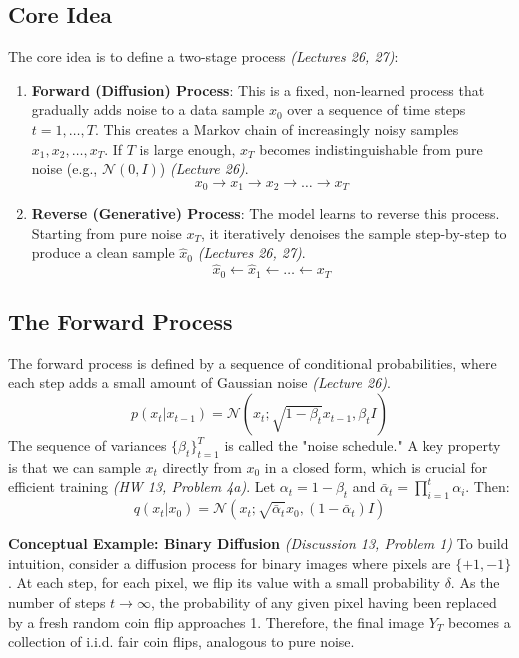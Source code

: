 \documentclass[11pt]{article}
\begin{document}
\subsection{Core Idea}
The core idea is to define a two-stage process \textit{(Lectures 26, 27)}:
\begin{enumerate}
    \item \textbf{Forward (Diffusion) Process}: This is a fixed, non-learned process that gradually adds noise to a data sample $x_0$ over a sequence of time steps $t=1, \dots, T$. This creates a Markov chain of increasingly noisy samples $x_1, x_2, \dots, x_T$. If $T$ is large enough, $x_T$ becomes indistinguishable from pure noise (e.g., $\mathcal{N}(0, I)$) \textit{(Lecture 26)}.
    \[ x_0 \rightarrow x_1 \rightarrow x_2 \rightarrow \dots \rightarrow x_T \]
    \item \textbf{Reverse (Generative) Process}: The model learns to reverse this process. Starting from pure noise $x_T$, it iteratively denoises the sample step-by-step to produce a clean sample $\hat{x}_0$ \textit{(Lectures 26, 27)}.
    \[ \hat{x}_0 \leftarrow \hat{x}_1 \leftarrow \dots \leftarrow x_T \]
\end{enumerate}

\subsection{The Forward Process}
The forward process is defined by a sequence of conditional probabilities, where each step adds a small amount of Gaussian noise \textit{(Lecture 26)}.
\[ p(x_t|x_{t-1}) = \mathcal{N}(x_t; \sqrt{1-\beta_t}x_{t-1}, \beta_t I) \]
The sequence of variances $\{\beta_t\}_{t=1}^T$ is called the "noise schedule." A key property is that we can sample $x_t$ directly from $x_0$ in a closed form, which is crucial for efficient training \textit{(HW 13, Problem 4a)}. Let $\alpha_t = 1 - \beta_t$ and $\bar{\alpha}_t = \prod_{i=1}^t \alpha_i$. Then:
\[ q(x_t|x_0) = \mathcal{N}(x_t; \sqrt{\bar{\alpha}_t}x_0, (1 - \bar{\alpha}_t)I) \]

\textbf{Conceptual Example: Binary Diffusion} \textit{(Discussion 13, Problem 1)}
To build intuition, consider a diffusion process for binary images where pixels are $\{+1, -1\}$. At each step, for each pixel, we flip its value with a small probability $\delta$. As the number of steps $t \to \infty$, the probability of any given pixel having been replaced by a fresh random coin flip approaches 1. Therefore, the final image $Y_T$ becomes a collection of i.i.d. fair coin flips, analogous to pure noise.
\end{document}
